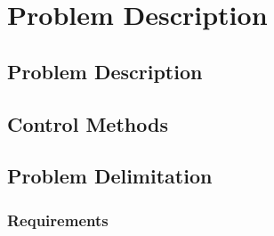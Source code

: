 \chapter{Problem Description}\label{ch:probdesc}

\section{Problem Description}


\section{Control Methods}


\section{Problem Delimitation}

\subsection{Requirements}\label{sub:req}